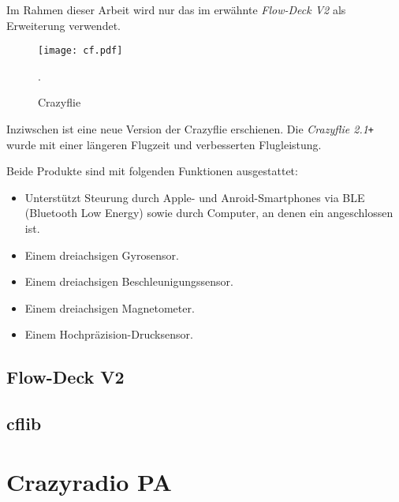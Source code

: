 Im Rahmen dieser Arbeit wird nur das im  erwähnte \textit{Flow-Deck V2} als Erweiterung verwendet.

\begin{figure}[H]
    \centering
        \texttt{[image: cf.pdf]}
    \caption{Crazyflie  \cite{bc:cf20}}.

        \label{pic:marker0}
\end{figure}

Inziwschen ist eine neue Version der Crazyflie erschienen. Die \textit{Crazyflie 2.1\texttt{+}} wurde mit einer längeren Flugzeit und verbesserten Flugleistung. 

Beide Produkte sind mit folgenden Funktionen ausgestattet:

\begin{itemize}
    \item Unterstützt Steurung durch Apple- und Anroid-Smartphones via BLE (Bluetooth Low Energy) sowie durch Computer, an denen ein  angeschlossen ist.
    \item Einem dreiachsigen Gyrosensor.\footnotemark
    \item Einem dreiachsigen Beschleunigungssensor.\footnotemark[\value{footnote}]
    \item Einem dreiachsigen Magnetometer.\footnotemark[\value{footnote}]
    \item Einem Hochpräzision-Drucksensor.
\end{itemize}


\subsection{Flow-Deck V2}
\label{sub:v2}

\blindtext

\subsection{cflib}
\label{sub:cflib}

\blindtext

\section{Crazyradio PA}
\label{sec:crpa}
\blindtext

\endgroup